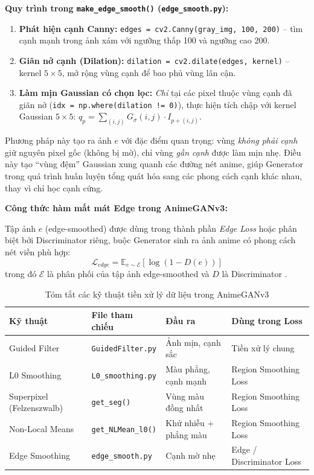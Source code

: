 \textbf{Quy trình trong \texttt{make\_edge\_smooth()} (\texttt{edge\_smooth.py}):}
\begin{enumerate}
    \item \textbf{Phát hiện cạnh Canny:} \texttt{edges = cv2.Canny(gray\_img, 100, 200)}
    -- tìm cạnh mạnh trong ảnh xám với ngưỡng thấp 100 và ngưỡng cao 200.
    \item \textbf{Giãn nở cạnh (Dilation):} \texttt{dilation = cv2.dilate(edges, kernel)}
    -- kernel $5 \times 5$, mở rộng vùng cạnh để bao phủ vùng lân cận.
    \item \textbf{Làm mịn Gaussian có chọn lọc:} \textit{Chỉ} tại các pixel thuộc vùng cạnh
    đã giãn nở (\texttt{idx = np.where(dilation != 0)}), thực hiện tích chập với kernel
    Gaussian $5 \times 5$: $q_p = \sum_{(i,j)} G_{\sigma}(i,j) \cdot I_{p+(i,j)}$.
\end{enumerate}

Phương pháp này tạo ra ảnh $e$ với đặc điểm quan trọng: vùng \textit{không phải cạnh} giữ
nguyên pixel gốc (không bị mờ), chỉ vùng \textit{gần cạnh} được làm mịn nhẹ. Điều này
tạo ``vùng đệm'' Gaussian xung quanh các đường nét anime, giúp Generator trong quá trình
huấn luyện tổng quát hóa sang các phong cách cạnh khác nhau, thay vì chỉ học cạnh cứng.

\textbf{Công thức hàm mất mát Edge trong AnimeGANv3:}

Tập ảnh $e$ (edge-smoothed) được dùng trong thành phần \textit{Edge Loss} hoặc phân biệt
bởi Discriminator riêng, buộc Generator sinh ra ảnh anime có phong cách nét viền phù hợp:
\begin{equation}
\label{eq:edge_loss}
\mathcal{L}_{edge} = \mathbb{E}_{e \sim \mathcal{E}}\left[\log(1 - D(e))\right]
\end{equation}
trong đó $\mathcal{E}$ là phân phối của tập ảnh edge-smoothed và $D$ là Discriminator
\cite{Chen2018CartoonGAN, Liu2024}.

\begin{table}[H]
\caption{Tóm tắt các kỹ thuật tiền xử lý dữ liệu trong AnimeGANv3}
\label{tab:preprocessing_summary}
\centering
\begin{tabular}{|p{3cm}|p{3.6cm}|p{2.9cm}|p{3.5cm}|}
\hline
\textbf{Kỹ thuật} & \textbf{File tham chiếu} & \textbf{Đầu ra} & \textbf{Dùng trong Loss} \\
\hline
Guided Filter & \texttt{GuidedFilter.py} & Ảnh mịn, cạnh sắc & Tiền xử lý chung \\
\hline
L0 Smoothing & \texttt{L0\_smoothing.py} & Màu phẳng, cạnh mạnh & Region Smoothing Loss \\
\hline
Superpixel (Felzenszwalb) & \texttt{get\_seg()} & Vùng màu đồng nhất & Region Smoothing Loss \\
\hline
Non-Local Means & \texttt{get\_NLMean\_l0()} & Khử nhiễu + phẳng màu & Region Smoothing Loss \\
\hline
Edge Smoothing & \texttt{edge\_smooth.py} & Cạnh mờ nhẹ & Edge / Discriminator Loss \\
\hline
\end{tabular}
\end{table}

